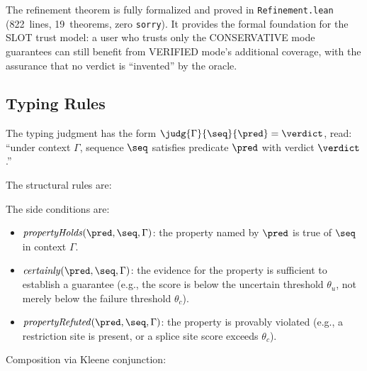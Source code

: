 \noindent The refinement theorem is fully formalized and proved in
\texttt{Refinement.lean} (822~lines, 19~theorems, zero
\texttt{sorry}).
It provides the formal foundation for the SLOT trust model: a user who
trusts only the CONSERVATIVE mode guarantees can still benefit from
VERIFIED mode's additional coverage, with the assurance that no
\PASS{} verdict is ``invented'' by the oracle.

\subsection{Typing Rules}\label{sec:typingrules}

The typing judgment has the form
$\judg{\Gamma}{\seq}{\pred} = \verdict$, read: ``under context
$\Gamma$, sequence $\seq$ satisfies predicate $\pred$ with verdict
$\verdict$.''

The structural rules are:


\noindent The side conditions are:
\begin{itemize}[leftmargin=*,itemsep=0pt,topsep=1pt]
\item $\mathit{propertyHolds}(\pred, \seq, \Gamma)$: the property
      named by $\pred$ is true of $\seq$ in context $\Gamma$.
\item $\mathit{certainly}(\pred, \seq, \Gamma)$: the evidence for
      the property is sufficient to establish a guarantee (e.g., the
      score is below the uncertain threshold $\theta_u$, not merely
      below the failure threshold $\theta_c$).
\item $\mathit{propertyRefuted}(\pred, \seq, \Gamma)$: the property
      is provably violated (e.g., a restriction site is present, or
      a splice site score exceeds $\theta_c$).
\end{itemize}

\noindent Composition via Kleene conjunction:

